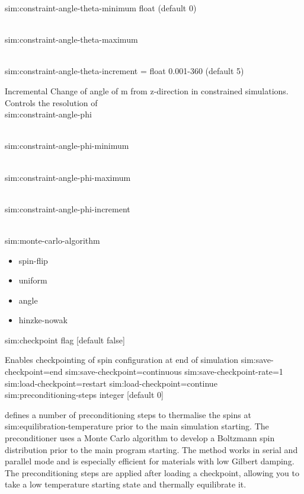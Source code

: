 {\zicf  sim:constraint-angle-theta-minimum float (default 0)}\\

{\zicf  sim:constraint-angle-theta-maximum}\\

{\zicf  sim:constraint-angle-theta-increment = float 0.001-360 (default 5)}
    Incremental Change of angle of m from z-direction in constrained simulations. Controls the resolution of \\

{\zicf sim:constraint-angle-phi}\\

{\zicf sim:constraint-angle-phi-minimum}\\

{\zicf sim:constraint-angle-phi-maximum}\\

{\zicf sim:constraint-angle-phi-increment}\\

{\zicf sim:monte-carlo-algorithm}
\begin{itemize}
  \item[] spin-flip
  \item[] uniform
  \item[] angle
  \item[] hinzke-nowak
\end{itemize}

{\zicf sim:checkpoint flag [default false]}
    Enables checkpointing of spin configuration at end of simulation
sim:save-checkpoint=end
sim:save-checkpoint=continuous
sim:save-checkpoint-rate=1
sim:load-checkpoint=restart
sim:load-checkpoint=continue\\

{\zicf sim:preconditioning-steps
    integer [default 0]}
    defines a number of preconditioning steps to thermalise the spins at
    sim:equilibration-temperature prior to the main simulation starting. The
    preconditioner uses a Monte Carlo algorithm to develop a Boltzmann spin
    distribution prior to the main program starting. The method works in serial
    and parallel mode and is especially efficient for materials with low Gilbert
    damping. The preconditioning steps are applied after loading a checkpoint,
    allowing you to take a low temperature starting state and thermally
    equilibrate it.\\

